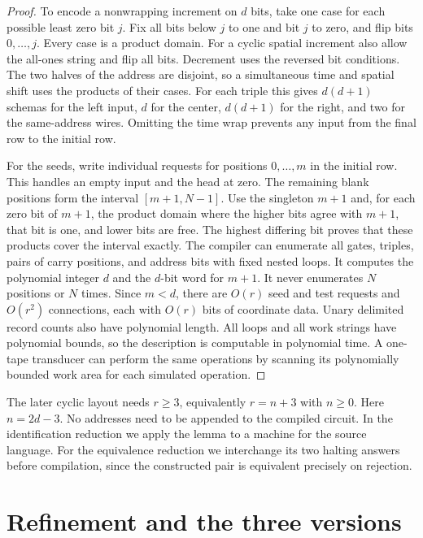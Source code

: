 \documentclass[11pt]{article}
\theoremstyle{definition}
\theoremstyle{remark}
\numberwithin{equation}{section}
\begin{document}
\begin{proof}
To encode a nonwrapping increment on $d$ bits, take one case for each
possible least zero bit $j$. Fix all bits below $j$ to one and bit $j$
to zero, and flip bits $0,\ldots,j$. Every case is a product domain.
For a cyclic spatial increment also allow the all-ones string and
flip all bits. Decrement uses the reversed bit conditions.
The two halves of the address are disjoint, so a simultaneous
time and spatial shift uses the products of their cases. For each
triple this gives $d(d+1)$ schemas for the left input, $d$ for the
center, $d(d+1)$ for the right, and two for the same-address wires.
Omitting the time wrap prevents any input from the final row to the
initial row.

For the seeds, write individual requests for positions $0,\ldots,m$
in the initial row. This handles an empty input and the head at zero.
The remaining blank positions form the interval $[m+1,N-1]$.
Use the singleton $m+1$ and, for each zero bit of $m+1$, the product
domain where the higher bits agree with $m+1$, that bit is one,
and lower bits are free. The highest differing bit proves that these
products cover the interval exactly. The compiler can enumerate all
gates, triples, pairs of carry positions, and address bits with fixed
nested loops. It computes the polynomial integer $d$ and the $d$-bit
word for $m+1$. It never enumerates $N$ positions or $N$ times.
Since $m<d$, there are $O(r)$ seed and test requests and $O(r^2)$
connections, each with $O(r)$ bits of coordinate data.
Unary delimited record counts also have polynomial length.
All loops and all work strings have polynomial bounds, so the
description is computable in polynomial time. A one-tape transducer
can perform the same operations by scanning its polynomially bounded
work area for each simulated operation.
\end{proof}

The later cyclic layout needs $r\ge3$, equivalently $r=n+3$ with
$n\ge0$. Here $n=2d-3$. No addresses need to be appended to the
compiled circuit. In the identification reduction we apply the lemma
to a machine for the source language. For the equivalence reduction we
interchange its two halting answers before compilation, since the
constructed pair is equivalent precisely on rejection.

\section{Refinement and the three versions}
\label{app:games}
\end{document}
